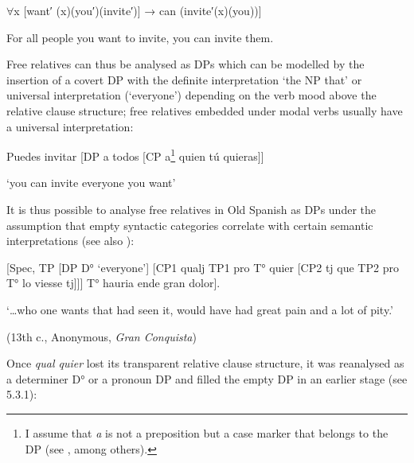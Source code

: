 \documentclass[output=paper]{langscibook}
\begin{document}
\begin{styleListParagraph}
\textmd{${\forall}$x [want′ (x)(you′)(invite′)] → can (invite′(x)(you))]}
\end{styleListParagraph}

\begin{styleListParagraph}
\textmd{For all people you want to invite, you can invite them.}
\end{styleListParagraph}

Free relatives can thus be analysed as DPs which can be modelled by the insertion of a covert DP with the definite interpretation ‘the NP that’ or universal interpretation (‘everyone’) depending on the verb mood above the relative clause structure; free relatives embedded under modal verbs usually have a universal interpretation:

\begin{styleListParagraph}
\textmd{  Puedes invitar [DP a todos [CP a}\footnote{ \textrm{I assume that} \textrm{\textit{a}} \textrm{is not a preposition but a case marker that belongs to the DP (see \citealt{Lopez2000}, among others).}}\textmd{ quien tú quieras]]}
\end{styleListParagraph}

\begin{styleListParagraph}
\textmd{  ‘you can invite everyone you want’}
\end{styleListParagraph}

It is thus possible to analyse free relatives in Old Spanish as DPs under the assumption that empty syntactic categories correlate with certain semantic interpretations (see also \citealt{Rivero1988}):

\begin{styleListParagraph}
\textmd{  [Spec, TP [DP D° ‘everyone’] [CP1 qualj TP1 pro T° quier [CP2 tj que TP2 pro T° lo viesse tj]]] T° hauria ende gran dolor].}
\end{styleListParagraph}

  ‘…who one wants that had seen it, would have had great pain and a lot of pity.’

\begin{styleListParagraph}
\textmd{  (13th c.,}\textmd{ }\textmd{Anonymous,} \textmd{\textit{Gran Conquista}}\textmd{)}
\end{styleListParagraph}

Once \textit{qual quier} lost its transparent relative clause structure, it was reanalysed as a determiner D° or a pronoun DP and filled the empty DP in an earlier stage (see 5.3.1):
\end{document}
